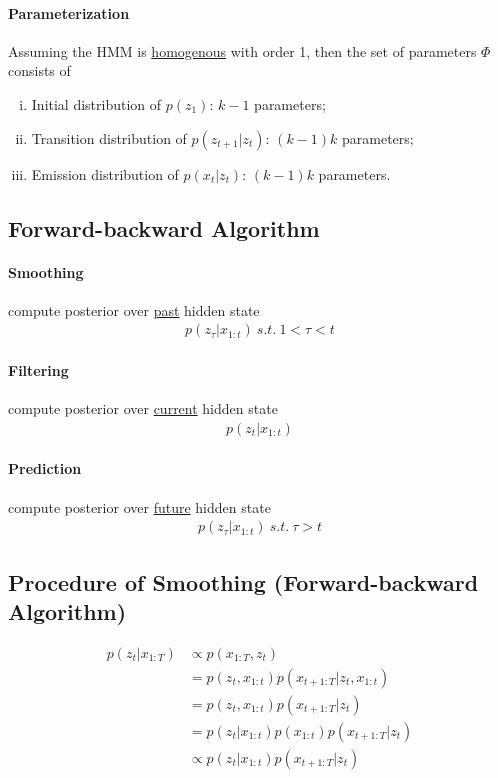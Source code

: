 \documentclass{article}
\begin{document}
	\paragraph{Parameterization} Assuming the HMM is \ul{homogenous} with order 1, then the set of parameters $\Phi$ consists of
	\begin{enumerate}[(i)]
		\item Initial distribution of $p(z_1)$: $k-1$ parameters;
		\item Transition distribution of $p(z_{t+1}|z_t)$: $(k-1)k$ parameters;
		\item Emission distribution of $p(x_t|z_t)$: $(k-1)k$ parameters.
	\end{enumerate}
	
	\subsection{Forward-backward Algorithm}
	\paragraph{Smoothing} compute posterior over \ul{past} hidden state
		\begin{align}
			p(z_\tau|x_{1:t})\ s.t.\ 1 < \tau < t
		\end{align}
	\paragraph{Filtering} compute posterior over \ul{current} hidden state
		\begin{align}
			p(z_t|x_{1:t})
		\end{align}
	\paragraph{Prediction} compute posterior over \ul{future} hidden state
		\begin{align}
			p(z_\tau|x_{1:t})\ s.t.\ \tau > t
		\end{align}
	
	\subsection{Procedure of Smoothing (Forward-backward Algorithm)}
	\begin{align}
		p(z_t | x_{1:T})
		&\propto p(x_{1:T}, z_t) \\
		&= p(z_t, x_{1:t}) p(x_{t+1:T}|z_t, x_{1:t}) \\
		&= p(z_t, x_{1:t}) p(x_{t+1:T}|z_t) \\
		&= p(z_t | x_{1:t}) p(x_{1:t}) p(x_{t+1:T}|z_t) \\
		&\propto  p(z_t | x_{1:t}) p(x_{t+1:T}|z_t)
	\end{align}
	
\end{document}
